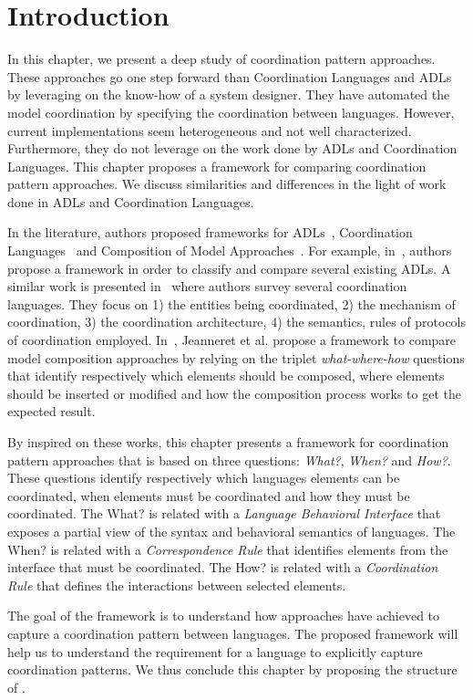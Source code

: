 \section{Introduction}
In this chapter, we present a deep study of coordination pattern approaches. These approaches go one step forward than Coordination Languages and ADLs by leveraging on the know-how of a system designer. They have automated the model coordination by specifying the coordination between languages. However, current implementations seem heterogeneous and not well characterized. Furthermore, they do not leverage on the work done by ADLs and Coordination Languages. This chapter proposes a framework for comparing coordination pattern approaches. We discuss similarities and differences in the light of work done in ADLs and Coordination Languages. 

In the literature, authors proposed frameworks for ADLs~\cite{frameadlsbib}, Coordination Languages~\cite{coordmodels} and Composition of Model Approaches~\cite{framecompoas}. For example, in~\cite{frameadlsbib}, authors propose a framework in order to classify and compare several existing ADLs. A similar work is presented in~\cite{coordmodels} where authors survey several coordination languages. They focus on 1) the entities being coordinated, 2) the mechanism of
coordination, 3) the coordination architecture, 4) the semantics, rules of protocols of coordination employed. In~\cite{framecompoas}, Jeanneret et al. propose a framework to compare model
composition approaches by relying on the triplet \emph{what-where-how} questions that identify respectively which elements should be composed, where elements should be inserted or modified and how the composition process works to get the expected result. 

By inspired on these works, this chapter presents a framework for coordination pattern approaches that is based on three questions: \emph{What?}, \emph{When?} and \emph{How?}. These questions identify respectively which languages elements can be coordinated, when elements must be coordinated and how they must be coordinated. The What? is related with a \emph{Language Behavioral Interface} that exposes a partial view of the syntax and behavioral semantics of languages. The When? is related with a \emph{Correspondence Rule} that identifies elements from the interface that must be coordinated. The How? is related with a \emph{Coordination Rule} that defines the interactions between selected elements. 

The goal of the framework is to understand how approaches have achieved to capture a coordination pattern between languages. The proposed framework will help us to understand the requirement for a language to explicitly capture coordination patterns. We thus conclude this chapter by proposing the structure of \bcool.  


